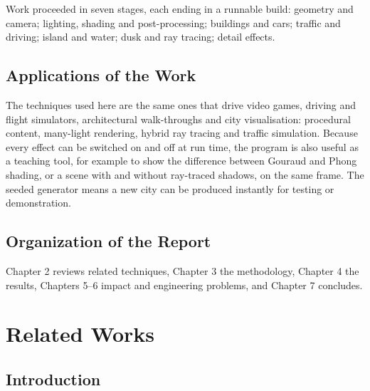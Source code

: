 \documentclass[12pt, a4paper]{report}
\begin{document}
\begin{justify}
  {\fontsize{12}{13.8}\selectfont
    Work proceeded in seven stages, each ending in a runnable build: geometry and camera; lighting, shading and post-processing; buildings and cars; traffic and driving; island and water; dusk and ray tracing; detail effects.
  }
\end{justify}

\section{Applications of the Work}

\begin{justify}
  {\fontsize{12}{13.8}\selectfont
    The techniques used here are the same ones that drive video games, driving and flight simulators, architectural walk-throughs and city visualisation: procedural content, many-light rendering, hybrid ray tracing and traffic simulation. Because every effect can be switched on and off at run time, the program is also useful as a teaching tool, for example to show the difference between Gouraud and Phong shading, or a scene with and without ray-traced shadows, on the same frame. The seeded generator means a new city can be produced instantly for testing or demonstration.
  }
\end{justify}

\section{Organization of the Report}

\begin{justify}
  {\fontsize{12}{13.8}\selectfont
    Chapter 2 reviews related techniques, Chapter 3 the methodology, Chapter 4 the results, Chapters 5--6 impact and engineering problems, and Chapter 7 concludes.
  }
\end{justify}

\chapter{Related Works}

\section{Introduction}
\end{document}
